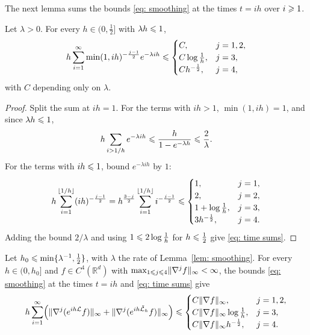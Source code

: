 The next lemma sums the bounds \eqref{eq: smoothing} at the times $t = ih$ over $i \geqslant 1$.

\begin{lemma}
\label{lem: time sums}
    Let $\lambda > 0$. For every $h \in (0,\frac12]$ with $\lambda h \leqslant 1$,
    \begin{equation}
        h \sum_{i=1}^{\infty} \min( 1, ih )^{-\frac{j-1}{2}} e^{-\lambda i h} \leqslant
        \begin{cases}
            C , & j = 1, 2 , \\
            C \log\frac1h , & j = 3 , \\
            C h^{-\frac12} , & j = 4 ,
        \end{cases}
        \label{eq: time sums}
    \end{equation}
    with $C$ depending only on $\lambda$.
\end{lemma}

\begin{proof}
    Split the sum at $ih = 1$. For the terms with $ih > 1$, $\min(1, ih) = 1$, and since $\lambda h \leqslant 1$,
    \begin{equation*}
        h \sum_{i > 1/h} e^{-\lambda i h} \leqslant \frac{h}{1 - e^{-\lambda h}} \leqslant \frac{2}{\lambda} .
    \end{equation*}
    For the terms with $ih \leqslant 1$, bound $e^{-\lambda ih}$ by $1$:
    \begin{equation*}
        h \sum_{i=1}^{\lfloor 1/h \rfloor} (ih)^{-\frac{j-1}{2}} = h^{\frac{3-j}{2}} \sum_{i=1}^{\lfloor 1/h \rfloor} i^{-\frac{j-1}{2}} \leqslant
        \begin{cases}
            1 , & j = 1 , \\
            2 , & j = 2 , \\
            1 + \log\frac1h , & j = 3 , \\
            3 h^{-\frac12} , & j = 4 .
        \end{cases}
    \end{equation*}
    Adding the bound $2/\lambda$ and using $1 \leqslant 2 \log\frac1h$ for $h \leqslant \frac12$ give \eqref{eq: time sums}.
\end{proof}

Let $h_0 \leqslant \min\{ \lambda^{-1}, \frac12 \}$, with $\lambda$ the rate of Lemma~\ref{lem: smoothing}. For every $h \in (0,h_0]$ and $f \in C^4(\mathbb R^d)$ with $\max_{1 \leqslant j \leqslant 4} \lVert \nabla^j f \rVert_\infty < \infty$, the bounds \eqref{eq: smoothing} at the times $t = ih$ and \eqref{eq: time sums} give
\begin{equation}
    h \sum_{i=1}^{\infty} \Bigl( \lVert \nabla^j ( e^{ih\mathcal L} f ) \rVert_\infty + \lVert \nabla^j ( e^{ih\tilde{\mathcal L}_h} f ) \rVert_\infty \Bigr) \leqslant
    \begin{cases}
        C \lVert \nabla f \rVert_\infty , & j = 1, 2 , \\
        C \lVert \nabla f \rVert_\infty \log\frac1h , & j = 3 , \\
        C \lVert \nabla f \rVert_\infty h^{-\frac12} , & j = 4 .
    \end{cases}
    \label{eq: summed smoothing}
\end{equation}

